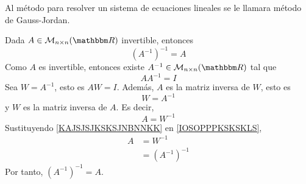 \begin{remark}
    Al método para resolver un sistema de ecuaciones lineales se le llamara método de Gauss-Jordan.
\end{remark}

\begin{proposition}
    Dada $A \in \mathcal{M}_{n \times n}(\RR)$ invertible, entonces
    $$\left(A^{-1}\right)^{-1} = A$$
    \demostracion Como $A$ es invertible, entonces existe $A^{-1} \in \mathcal{M}_{n \times n}(\RR)$ tal que
    $$AA^{-1}=I$$
    Sea $W = A^{-1}$, esto es $AW=I$. Además, $A$ es la matriz inversa de $W$, esto es
    \begin{equation}
        W = A^{-1} \label{KAJSJSJKSKSJNBNNKK}
    \end{equation}
    y $W$ es la matriz inversa de $A$. Es decir,
    \begin{equation}
        A = W^{-1} \label{IOSOPPPKSKSKLS}
    \end{equation}
    Sustituyendo \eqref{KAJSJSJKSKSJNBNNKK} en \eqref{IOSOPPPKSKSKLS},
    \begin{align*}
        A & = W^{-1} \\
        & = \left(A^{-1}\right)^{-1}
    \end{align*}
    Por tanto, $\left(A^{-1}\right)^{-1} = A$.
\end{proposition}

